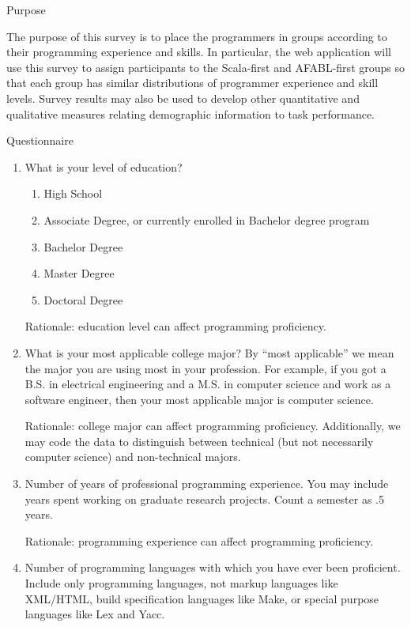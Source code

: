 Purpose

The purpose of this survey is to place the programmers in groups according to their programming experience and skills.  In particular, the web application will use this survey to assign participants to the Scala-first and AFABL-first groups so that each group has similar distributions of programmer experience and skill levels.  Survey results may also be used to develop other quantitative and qualitative measures relating demographic information to task performance.

Questionnaire

\begin{enumerate}

\item What is your level of education?

\begin{enumerate}
\item High School
\item Associate Degree, or currently enrolled in Bachelor degree program
\item Bachelor Degree
\item Master Degree
\item Doctoral Degree
\end{enumerate}

Rationale: education level can affect programming proficiency.

\item What is your most applicable college major? By “most applicable” we mean the major you are using most in your profession. For example, if you got a B.S. in electrical engineering and a M.S. in computer science and work as a software engineer, then your most applicable major is computer science.

Rationale: college major can affect programming proficiency.  Additionally, we may code the data to distinguish between technical (but not necessarily computer science) and non-technical majors.

\item Number of years of professional programming experience. You may include years spent working on graduate research projects. Count a semester as .5 years.

Rationale: programming experience can affect programming proficiency.

\item Number of programming languages with which you have ever been proficient. Include only programming languages, not markup languages like XML/HTML, build specification languages like Make, or special purpose languages like Lex and Yacc.


\end{enumerate}
